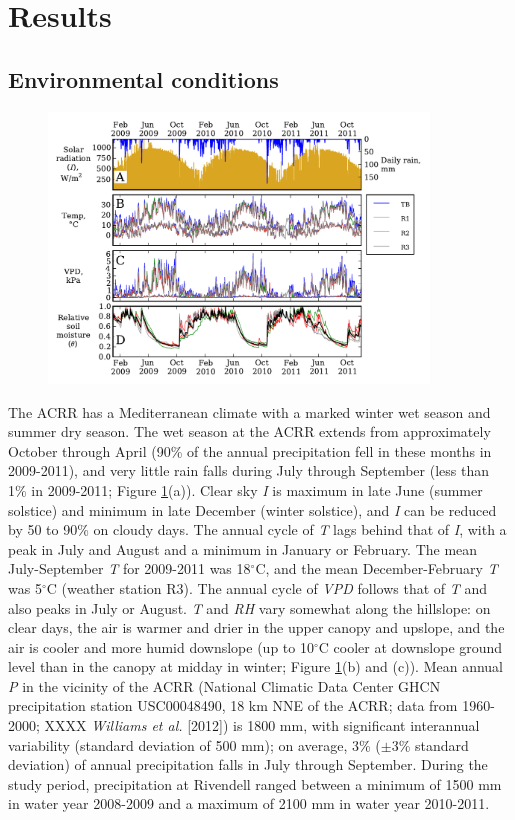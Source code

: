 \section{Results}

\subsection{Environmental conditions}

\begin{figure}[here]
\includegraphics[width=0.9\textwidth]{ch1-sapflow/figures/Figure03.pdf}
\caption{}
\label{fig:sapflow_met}
\end{figure}

The ACRR has a Mediterranean climate with a marked winter wet season and summer dry season.  The wet season at the ACRR extends from approximately October through April (90\% of the annual precipitation fell in these months in 2009-2011), and very little rain falls during July through September (less than 1\% in 2009-2011; Figure \ref{fig:sapflow_met}(a)).  Clear sky \textit{I} is maximum in late June (summer solstice) and minimum in late December (winter solstice), and \textit{I} can be reduced by 50 to 90\% on cloudy days.  The annual cycle of \textit{T} lags behind that of \textit{I}, with a peak in July and August and a minimum in January or February. The mean July-September \textit{T} for 2009-2011 was 18$^{\circ}$C, and the mean December-February \textit{T} was 5$^{\circ}$C (weather station R3).  The annual cycle of \textit{VPD} follows that of \textit{T} and also peaks in July or August.  \textit{T} and \textit{RH} vary somewhat along the hillslope: on clear days, the air is warmer and drier in the upper canopy and upslope, and the air is cooler and more humid downslope (up to 10$^{\circ}$C cooler at downslope ground level than in the canopy at midday in winter; Figure \ref{fig:sapflow_met}(b) and (c)).  Mean annual \textit{P} in the vicinity of the ACRR (National Climatic Data Center GHCN precipitation station USC00048490, 18 km NNE of the ACRR; data from 1960-2000; XXXX \textit{Williams et al.} [2012]) is 1800 mm, with significant interannual variability (standard deviation of 500 mm); on average, 3\% ($\pm$3\% standard deviation) of annual precipitation falls in July through September.  During the study period, precipitation at Rivendell ranged between a minimum of 1500 mm in water year 2008-2009 and a maximum of 2100 mm in water year 2010-2011.


